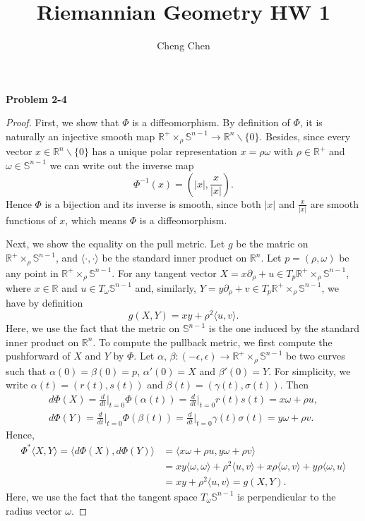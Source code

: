 \documentclass[11pt, a4paper]{article}
\title{Riemannian Geometry HW 1}
\author{Cheng Chen}
\date{}
\theoremstyle{plain}
\theoremstyle{definition}
\theoremstyle{remark}
\newcommand{\dd}{\partial}
\newcommand{\cR}{\mathbb{R}}
\newcommand{\cS}{\mathbb{S}}
\newcommand{\aM}{\cR^+ \times_\rho \cS^{n-1}}
\begin{document}
\maketitle

\noindent\textbf{Problem 2-4}
\begin{proof}
    First, we show that $\Phi$ is a diffeomorphism. By definition of $\Phi$, it is naturally an injective smooth map $\aM \to \cR^n\backslash \{0\}$.
    Besides, since every vector $x\in \cR^n \backslash \{0\}$ has a unique polar representation $x = \rho\omega$ with $\rho \in \cR^+$ and $\omega \in \cS^{n-1}$
    we can write out the inverse map
    \[ \Phi^{-1}(x) = (|x|, \frac{x}{|x|}). \]
    Hence $\Phi$ is a bijection and its inverse is smooth, since both $|x|$ and $\frac{x}{|x|}$ are smooth functions of $x$, which means $\Phi$ is a diffeomorphism.

    Next, we show the equality on the pull metric. Let $g$ be the matric on $\aM$, and $\langle \cdot, \cdot \rangle$ be the standard inner product on $\cR^n$.
    Let $p = (\rho,\omega)$ be any point in $\aM$. For any tangent vector $X = x\dd_\rho + u \in T_p\aM$, where $x\in \cR$ and $u \in T_\omega \cS^{n-1}$ and,
    similarly, $Y = y\dd_\rho + v \in T_p\aM$, we have by definition
    \[ g(X,Y) = xy + \rho^2 \langle u, v \rangle. \]
    Here, we use the fact that the metric on $\cS^{n-1}$ is the one induced by the standard inner product on $\cR^n$.
    To compute the pullback metric, we first compute the pushforward of $X$ and $Y$ by $\Phi$. Let 
    $\alpha,\,\beta : (-\epsilon, \epsilon) \to \aM$ be two curves such that $\alpha(0) = \beta(0) = p$, $\alpha'(0) = X$ and $\beta'(0) = Y$. 
    For simplicity, we write $\alpha(t) = (r(t),s(t))$ and $\beta(t) = (\gamma(t),\sigma(t))$. Then
    \begin{align*}
        d\Phi(X) = \frac{d}{dt}\Big|_{t=0} \Phi(\alpha(t)) = \frac{d}{dt}\Big|_{t=0} r(t)s(t) = x\omega + \rho u, \\
        d\Phi(Y) = \frac{d}{dt}\Big|_{t=0} \Phi(\beta(t)) = \frac{d}{dt}\Big|_{t=0} \gamma(t)\sigma(t) = y\omega + \rho v.
    \end{align*}
    Hence,
    \begin{align*}
        \Phi^* \langle X, Y \rangle = \langle d\Phi(X), d\Phi(Y) \rangle &= \langle x\omega + \rho u, y\omega + \rho v \rangle \\
        &= xy\langle \omega,\omega \rangle + \rho^2 \langle u, v \rangle + x\rho\langle\omega,v \rangle + y\rho\langle\omega,u \rangle \\
        &= xy + \rho^2 \langle u, v \rangle = g(X,Y).
    \end{align*}
    Here, we use the fact that the tangent space $T_\omega \cS^{n-1}$ is perpendicular to the radius vector $\omega$.
\end{proof}
\end{document}
